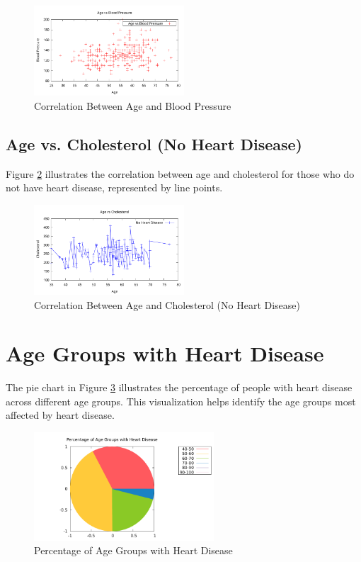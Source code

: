 \documentclass{article}
\begin{document}
	\begin{figure}[h]
		\centering
		\includegraphics[width=0.5\textwidth]{q4-b.pdf}
		\caption{Correlation Between Age and Blood Pressure}
		\label{fig:age_vs_bp}
	\end{figure}
	
	\subsection{Age vs. Cholesterol (No Heart Disease)}
	Figure \ref{fig:age_vs_cholesterol} illustrates the correlation between age and cholesterol for those who do not have heart disease, represented by line points.
	
	\begin{figure}[h]
		\centering
		\includegraphics[width=0.5\textwidth]{q4-c.pdf}
		\caption{Correlation Between Age and Cholesterol (No Heart Disease)}
		\label{fig:age_vs_cholesterol}
	\end{figure}
	
	\section{Age Groups with Heart Disease}
	The pie chart in Figure \ref{fig:age_group_pie} illustrates the percentage of people with heart disease across different age groups. This visualization helps identify the age groups most affected by heart disease.
	
	\begin{figure}[h]
		\centering
		\includegraphics[width=0.6\textwidth]{q4-d.pdf}
		\caption{Percentage of Age Groups with Heart Disease}
		\label{fig:age_group_pie}
	\end{figure}
	
\end{document}
